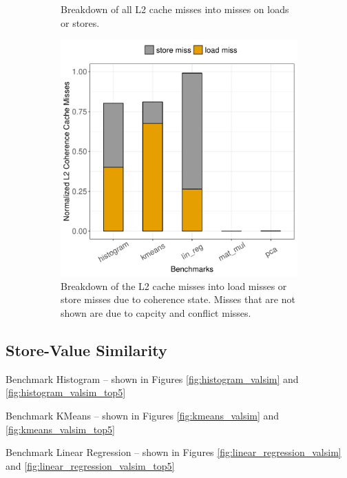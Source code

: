 \begin{figure}[htbp]
\begin{subfigure}{0.33\textwidth}
		\caption{Breakdown of all L2 cache misses into misses on loads or stores.}
	\end{subfigure}
	\begin{subfigure}{0.33\textwidth}
		\centering
		\includegraphics[scale=0.4]{graphs/coherence_misses_L2.pdf}
		\caption{Breakdown of the L2 cache misses into load misses or store misses due to coherence state. Misses that are not shown are due to capcity and conflict misses.}
	\end{subfigure}
\caption{} %
\label{fig:L2_misses}
\end{figure}


\subsection*{Store-Value Similarity}


Benchmark Histogram -- shown in Figures \ref{fig:histogram_valsim} and \ref{fig:histogram_valsim_top5}

Benchmark KMeans -- shown in Figures \ref{fig:kmeans_valsim} and \ref{fig:kmeans_valsim_top5}

Benchmark Linear Regression -- shown in Figures \ref{fig:linear_regression_valsim} and \ref{fig:linear_regression_valsim_top5}

